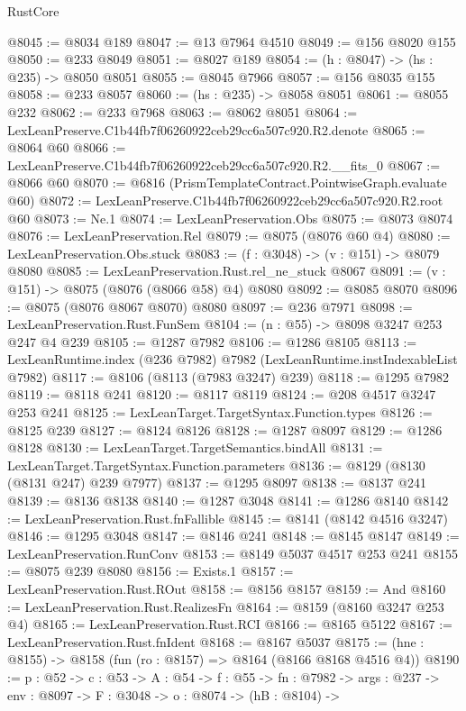 \begin{lexlean}{RustCore}
\begin{coremodule}
@8045 := @8034 @189
@8047 := @13 @7964 @4510
@8049 := @156 @8020 @155
@8050 := @233 @8049
@8051 := @8027 @189
@8054 := (h : @8047) -> (hs : @235) -> @8050 @8051
@8055 := @8045 @7966
@8057 := @156 @8035 @155
@8058 := @233 @8057
@8060 := (hs : @235) -> @8058 @8051
@8061 := @8055 @232
@8062 := @233 @7968
@8063 := @8062 @8051
@8064 := LexLeanPreserve.C1b44fb7f06260922ceb29cc6a507c920.R2.denote
@8065 := @8064 @60
@8066 := LexLeanPreserve.C1b44fb7f06260922ceb29cc6a507c920.R2.__fits_0
@8067 := @8066 @60
@8070 := @6816 (PrismTemplateContract.PointwiseGraph.evaluate @60)
@8072 := LexLeanPreserve.C1b44fb7f06260922ceb29cc6a507c920.R2.root @60
@8073 := Ne.{1}
@8074 := LexLeanPreservation.Obs
@8075 := @8073 @8074
@8076 := LexLeanPreservation.Rel
@8079 := @8075 (@8076 @60 @4)
@8080 := LexLeanPreservation.Obs.stuck
@8083 := (f : @3048) -> (v : @151) -> @8079 @8080
@8085 := LexLeanPreservation.Rust.rel_ne_stuck @8067
@8091 := (v : @151) -> @8075 (@8076 (@8066 @58) @4) @8080
@8092 := @8085 @8070
@8096 := @8075 (@8076 @8067 @8070) @8080
@8097 := @236 @7971
@8098 := LexLeanPreservation.Rust.FunSem
@8104 := (n : @55) -> @8098 @3247 @253 @247 @4 @239
@8105 := @1287 @7982
@8106 := @1286 @8105
@8113 := LexLeanRuntime.index (@236 @7982) @7982 (LexLeanRuntime.instIndexableList @7982)
@8117 := @8106 (@8113 (@7983 @3247) @239)
@8118 := @1295 @7982
@8119 := @8118 @241
@8120 := @8117 @8119
@8124 := @208 @4517 @3247 @253 @241
@8125 := LexLeanTarget.TargetSyntax.Function.types
@8126 := @8125 @239
@8127 := @8124 @8126
@8128 := @1287 @8097
@8129 := @1286 @8128
@8130 := LexLeanTarget.TargetSemantics.bindAll
@8131 := LexLeanTarget.TargetSyntax.Function.parameters
@8136 := @8129 (@8130 (@8131 @247) @239 @7977)
@8137 := @1295 @8097
@8138 := @8137 @241
@8139 := @8136 @8138
@8140 := @1287 @3048
@8141 := @1286 @8140
@8142 := LexLeanPreservation.Rust.fnFallible
@8145 := @8141 (@8142 @4516 @3247)
@8146 := @1295 @3048
@8147 := @8146 @241
@8148 := @8145 @8147
@8149 := LexLeanPreservation.RunConv
@8153 := @8149 @5037 @4517 @253 @241
@8155 := @8075 @239 @8080
@8156 := Exists.{1}
@8157 := LexLeanPreservation.Rust.ROut
@8158 := @8156 @8157
@8159 := And
@8160 := LexLeanPreservation.Rust.RealizesFn
@8164 := @8159 (@8160 @3247 @253 @4)
@8165 := LexLeanPreservation.Rust.RCI
@8166 := @8165 @5122
@8167 := LexLeanPreservation.Rust.fnIdent
@8168 := @8167 @5037
@8175 := (hne : @8155) -> @8158 (fun (ro : @8157) => @8164 (@8166 @8168 @4516 @4))
@8190 := {p : @52} ->
  {c : @53} ->
  {A : @54} ->
  {f : @55} ->
  {fn : @7982} ->
  {args : @237} ->
  {env : @8097} ->
  {F : @3048} ->
  {o : @8074} ->
  (hB : @8104) ->

\end{coremodule}
\end{lexlean}
